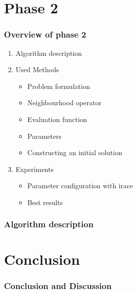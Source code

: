 \documentclass{beamer}
\begin{document}
\section{Phase 2}
  \begin{frame}
    \frametitle{Overview of phase 2}
    \begin{enumerate}

        \item Algorithm description
        \item Used Methods
          \begin{itemize}
            \item Problem formulation
            \item Neighbourhood operator
            \item Evaluation function
            \item Parameters
            \item Constructing an initial solution
          \end{itemize}
        \item Experiments
          \begin{itemize}
          \item Parameter configuration with irace
          \item Best results
          \end{itemize}


    \end{enumerate}
  \end{frame}


\begin{frame}
    \frametitle{Algorithm description}


  \end{frame}


  \section{Conclusion}
  \begin{frame}
    \frametitle{Conclusion and Discussion}


  \end{frame}


\end{document}
